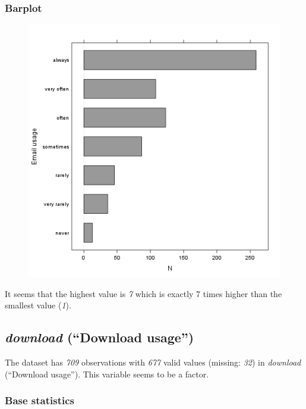 \documentclass{article}
\makeatletter
\def\maxwidth{\ifdim\Gin@nat@width>\linewidth\linewidth
\else\Gin@nat@width\fi}
\let\Oldincludegraphics\includegraphics
\renewcommand{\includegraphics}[1]{\Oldincludegraphics[width=\maxwidth]{#1}}
\makeatother
\begin{document}
\subsubsection{Barplot}

\begin{figure}[htbp]
\centering
\includegraphics{895cde198b269bf65b01e1e067a515c8.png}
\caption{}
\end{figure}

It seems that the highest value is \emph{7} which is exactly 7 times
higher than the smallest value (\emph{1}).

\subsection{\emph{download} (``Download usage'')}

The dataset has \emph{709} observations with \emph{677} valid values
(missing: \emph{32}) in \emph{download} (``Download usage''). This
variable seems to be a factor.

\subsubsection{Base statistics}
\end{document}
